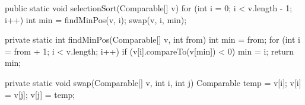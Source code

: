 \begin{unipdcode}[language=Java]
public static void selectionSort(Comparable[] v) {
    for (int i = 0; i < v.length - 1; i++) {
        int min = findMinPos(v, i);
        swap(v, i, min);
    }
}

private static int findMinPos(Comparable[] v, int from) {
    int min = from;
    for (int i = from + 1; i < v.length; i++)
        if (v[i].compareTo(v[min]) < 0) min = i;
    return min;
}

private static void swap(Comparable[] v, int i, int j) {
    Comparable temp = v[i];
    v[i] = v[j];
    v[j] = temp;
}
\end{unipdcode}
